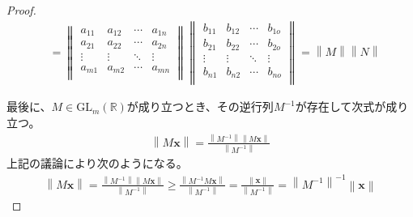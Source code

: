 \documentclass[dvipdfmx]{jsarticle}
\begin{document}
\begin{proof}
\begin{align*}
&= \left\| \begin{matrix}
a_{11} & a_{12} & \cdots & a_{1n} \\
a_{21} & a_{22} & \cdots & a_{2n} \\
 \vdots & \vdots & \ddots & \vdots \\
a_{m1} & a_{m2} & \cdots & a_{mn} \\
\end{matrix} \right\|\left\| \begin{matrix}
b_{11} & b_{12} & \cdots & b_{1o} \\
b_{21} & b_{22} & \cdots & b_{2o} \\
 \vdots & \vdots & \ddots & \vdots \\
b_{n1} & b_{n2} & \cdots & b_{no} \\
\end{matrix} \right\| = \left\| M \right\|\left\| N \right\|
\end{align*}\par
最後に、$M \in \mathrm{GL}_{m}\left( \mathbb{R} \right)$が成り立つとき、その逆行列$M^{- 1}$が存在して次式が成り立つ。
\begin{align*}
\left\| M\mathbf{x} \right\| = \frac{\left\| M^{- 1} \right\|\left\| M\mathbf{x} \right\|}{\left\| M^{- 1} \right\|}
\end{align*}
上記の議論により次のようになる。
\begin{align*}
\left\| M\mathbf{x} \right\| = \frac{\left\| M^{- 1} \right\|\left\| M\mathbf{x} \right\|}{\left\| M^{- 1} \right\|} \geq \frac{\left\| M^{- 1}M\mathbf{x} \right\|}{\left\| M^{- 1} \right\|} = \frac{\left\| \mathbf{x} \right\|}{\left\| M^{- 1} \right\|} = \left\| M^{- 1} \right\|^{- 1}\left\| \mathbf{x} \right\|
\end{align*}
\end{proof}
\end{document}
